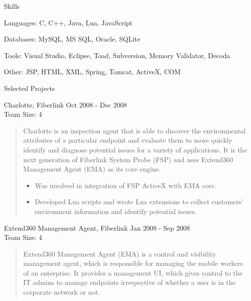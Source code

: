 \documentclass{resume}
\newcommand{\teamsize}{\\\sc\footnotesize Team Size: }
\begin{document}
\begin{category}{Skills}{}

    \item {\topic Languages:} C, C++, Java, Lua, JavaScript
    \item {\topic Databases:} MySQL, MS SQL, Oracle, SQLite
    \item {\topic Tools:} Visual Studio,  Eclipse, Toad, Subversion, Memory
        Validator, Decoda
    \item {\topic Other:} JSP, HTML, XML, Spring, Tomcat,  ActiveX, COM

\end{category}


\begin{category}{Selected Projects}{}

    \item {\topic Charlotte,} Fiberlink
        {\period Oct 2008 - Dec 2008}
        {\teamsize 4}
        \begin{quote}
            Charlotte is an inspection agent that is able to discover the
            environmental attributes of a particular endpoint and evaluate them
            to more quickly identify and diagnose potential issues for a
            variety of applications. It is the next generation of Fiberlink
            System Probe (FSP) and uses Extend360 Management Agent (EMA) as its
            core engine.
            \begin{itemize}
                \item Was involved in integration of FSP ActiveX with EMA core.
                \item Developed Lua scripts and wrote Lua extensions to collect
                    customers' environment information and identify potential
                    issues.
            \end{itemize}
        \end{quote}

    \item {\topic Extend360 Management Agent,} Fiberlink
        {\period Jan 2008 - Sep 2008}
        {\teamsize 4}
        \begin{quote}
            Extend360 Management Agent (EMA) is a control and visibility
            management agent, which is responsible for managing the mobile
            workers of an enterprise. It provides a management UI, which gives
            control to the IT admins to manage endpoints irrespective of
            whether a user is in the corporate network or not.


\end{quote}
\end{category}
\end{document}
